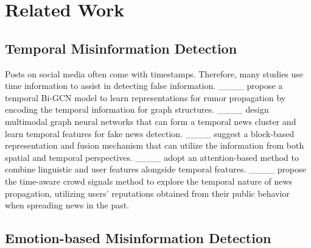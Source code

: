 \section{Related Work}
\subsection{Temporal Misinformation Detection}

Posts on social media often come with timestamps. Therefore, many studies use time information to assist in detecting false information. ____ propose a temporal Bi-GCN model to learn representations for rumor propagation by encoding the temporal information for graph structures. ____ design multimodal graph neural networks that can form a temporal news cluster and learn temporal features for fake news detection. ____ suggest a block-based representation and fusion mechanism that can utilize the information from both spatial and temporal perspectives. ____ adopt an attention-based method to combine linguistic and user features alongside temporal features. ____ propose the time-aware crowd signals method to explore the temporal nature of news propagation, utilizing users’ reputations obtained from their public behavior when spreading news in the past.



\subsection{Emotion-based Misinformation Detection}

